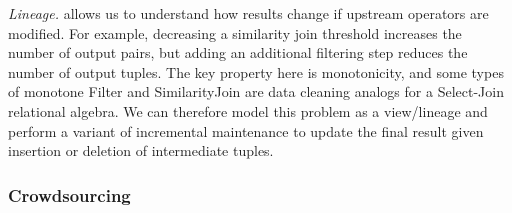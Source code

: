 \textit{Lineage.} allows us to understand how results change if upstream operators are modified.
For example, decreasing a similarity join threshold increases the number of output pairs, but adding an additional filtering step 
reduces the number of output tuples. The key property here is monotonicity, and some types of monotone \textsf{Filter} and \textsf{SimilarityJoin} are data cleaning analogs for a Select-Join relational algebra.
We can therefore model this problem as a view/lineage and perform a variant of incremental maintenance to update the 
final result given insertion or deletion of intermediate tuples.

\iffalse
\vspace{.5em}

{\noindent \bf Cost Estimates:} Of course, changing plans when using crowdsourcing may significantly change its cost.
For every recommendation, we estimate the number of additional tuples processed by the crowd operators and provide 
the user with an estimated cost.

\fi



\vspace{-0.2cm}
\subsubsection{Crowdsourcing}
\vspace{.2em}

